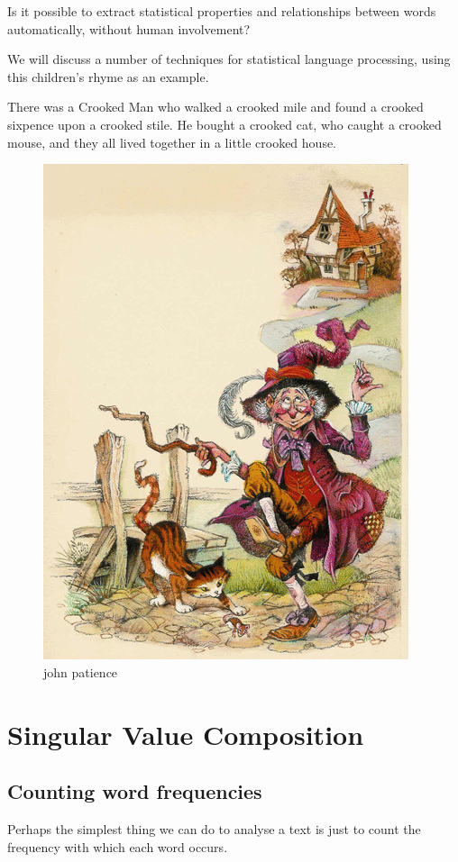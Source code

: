 \documentclass[11pt]{article}
\begin{document}
Is it possible to extract statistical properties and relationships between words automatically, without human involvement?

We will discuss a number of techniques for statistical language processing, using this children's rhyme as an example.

There was a Crooked Man who walked a crooked mile and found a crooked sixpence upon a crooked stile.
He bought a crooked cat, who caught a crooked mouse, and they all lived together in a little crooked house.

\begin{figure}[H]
    \centering
    \includegraphics{../out/images/john_patience}
    \caption[john patience]{john patience}
    \label{fig:john patience}
\end{figure}

\section{Singular Value Composition}\label{sec:singular-value-composition}
\subsection{Counting word frequencies}\label{subsec:counting-word-frequencies}
Perhaps the simplest thing we can do to analyse a text is just to count the frequency with which each word occurs.
\end{document}
